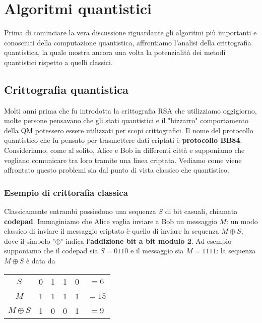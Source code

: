 
\chapter{Algoritmi quantistici}

\vspace{1cm}


\vspace{0.5cm}

\noindent Prima di cominciare la vera discussione riguardante gli algoritmi più importanti e conosciuti della computazione quantistica, affrontiamo l'analisi della crittografia quantistica, la quale mostra ancora una volta la potenzialità dei metodi quantistici rispetto a quelli classici. 

\section{Crittografia quantistica}
Molti anni prima che fu introdotta la crittografia RSA che utilizziamo oggigiorno, molte persone pensavano che gli stati quantistici e il "bizzarro" comportamento della QM potessero essere utilizzati per scopi crittografici. Il nome del protocollo quantistico che fu pensato per trasmettere dati criptati è \textbf{protocollo BB84}. Consideriamo, come al solito, Alice e Bob in differenti città e supponiamo che vogliano comunicare tra loro tramite una linea criptata. Vediamo come viene affrontato questo problemi sia dal punto di vista classico che quantistico. 

\subsection{Esempio di crittorafia classica}
Classicamente entrambi possiedono una sequenza $S$ di bit casuali, chiamata \textbf{codepad}. Immaginiamo che Alice voglia inviare a Bob un messaggio $M$: un modo classico di inviare il messaggio criptato è quello di inviare la sequenza $M \oplus S$, dove il simbolo "$\oplus$" indica l'\textbf{addizione bit a bit modulo 2}. Ad esempio supponiamo che il codepad sia $S = 0110$ e il messaggio sia $M = 1111$: la sequenza $M \oplus S$ è data da 
\begin{table}[!ht]
	\centering
    \begin{tabular}{c|cccc|c}
        \toprule
        $S$ & 0 & 1 & 1 & 0 & $= 6$ \\
        $M$ & 1 & 1 & 1 & 1 & $=15$ \\
        \midrule
        $M \oplus S$ & 1 & 0 & 0 & 1 & $=9$ \\
        \bottomrule
    \end{tabular}
\end{table}


